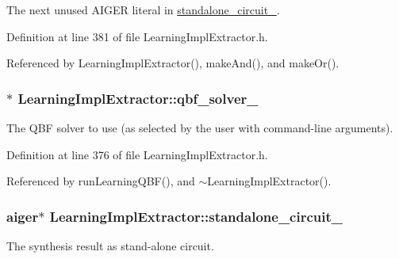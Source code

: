 The next unused A\-I\-G\-E\-R literal in \hyperlink{classLearningImplExtractor_a17f7c47bf3e84fa5a70930e01a18deb2}{standalone\-\_\-circuit\-\_\-}. 



Definition at line 381 of file Learning\-Impl\-Extractor.\-h.



Referenced by Learning\-Impl\-Extractor(), make\-And(), and make\-Or().

\hypertarget{classLearningImplExtractor_a4147358129fcfb9e72a0ee27d7c16f51}{
\subsubsection[{qbf\-\_\-solver\-\_\-}]{$\ast$ Learning\-Impl\-Extractor\-::qbf\-\_\-solver\-\_\-\hspace{0.3cm}{\ttfamily [protected]}}}\label{classLearningImplExtractor_a4147358129fcfb9e72a0ee27d7c16f51}


The Q\-B\-F solver to use (as selected by the user with command-\/line arguments). 



Definition at line 376 of file Learning\-Impl\-Extractor.\-h.



Referenced by run\-Learning\-Q\-B\-F(), and $\sim$\-Learning\-Impl\-Extractor().

\hypertarget{classLearningImplExtractor_a17f7c47bf3e84fa5a70930e01a18deb2}{
\subsubsection[{standalone\-\_\-circuit\-\_\-}]{\setlength{\rightskip}{0pt plus 5cm}aiger$\ast$ Learning\-Impl\-Extractor\-::standalone\-\_\-circuit\-\_\-\hspace{0.3cm}{\ttfamily [protected]}}}\label{classLearningImplExtractor_a17f7c47bf3e84fa5a70930e01a18deb2}


The synthesis result as stand-\/alone circuit. 

